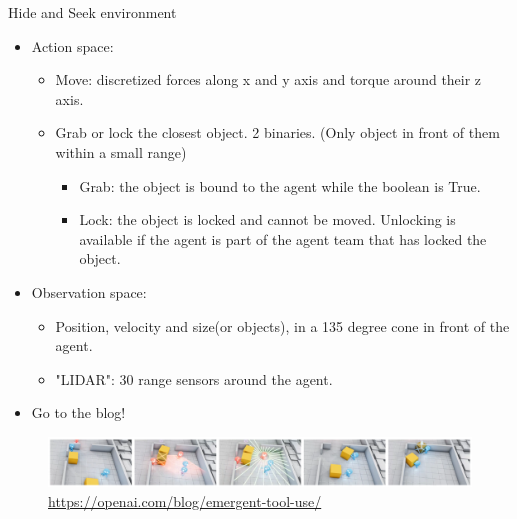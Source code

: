 \documentclass[9pt, hyperref={pdfusetitle,colorlinks=true,allcolors=DarkBlue}]{beamer}
\begin{document}
\begin{frame}{Hide and Seek environment}
\begin{itemize}
    \item Action space:
    \begin{itemize}
        \item Move: discretized forces along x and y axis and torque around their z axis.
        \item Grab or lock the closest object. 2 binaries. (Only object in front of them within a small range)
        \begin{itemize}
        \item Grab: the object is bound to the agent while the boolean is True.
        \item Lock: the object is locked and cannot be moved. Unlocking is available if the agent is part of the agent team that has locked the object.
        \end{itemize}{}
        
    \end{itemize}{}
    \item Observation space:
    \begin{itemize}
        \item Position, velocity and size(or objects), in a 135 degree cone in front of the agent.
        \item "LIDAR": 30 range sensors around the agent.
    \end{itemize}{}
    \item Go to the blog!
\end{itemize}{}
    \begin{figure}
    \centering
    \includegraphics[scale=0.2]{hasblog1.png}
        \caption{\url{https://openai.com/blog/emergent-tool-use/}}
    \end{figure}
\end{frame}{}
\end{document}
